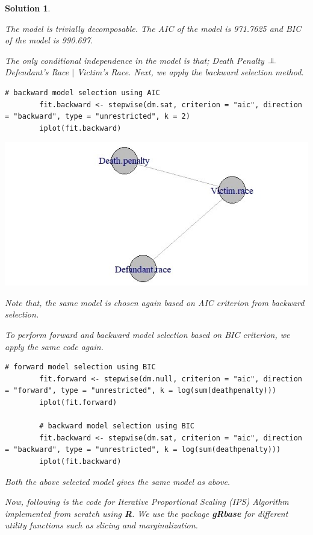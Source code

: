 \documentclass[12pt]{article}
\theoremstyle{problemstyle}
\newtheorem*{solution*}{Solution}
\newcommand{\indep}{\mathrel{\text{\scalebox{1.07}{$\perp\mkern-10mu\perp$}}}}
\begin{document}
\begin{solution*}
\begin{enumerate}
	 The model is trivially decomposable. The AIC of the model is 971.7625 and BIC of the model is 990.697.
	 
	 The only conditional independence in the model is that; Death Penalty $\indep$ Defendant's Race $\mid$ Victim's Race. Next, we apply the backward selection method. 
	 
	 
	 \begin{lstlisting}[style = R-code]
	 	# backward model selection using AIC
	 	fit.backward <- stepwise(dm.sat, criterion = "aic", direction = "backward", type = "unrestricted", k = 2)
	 	iplot(fit.backward)
	 \end{lstlisting}
	
	\includegraphics[width=\linewidth]{dp-aic-backward.jpeg}
	
	Note that, the same model is chosen again based on AIC criterion from backward selection.
	
	
	To perform forward and backward model selection based on BIC criterion, we apply the same code again.
	
	\begin{lstlisting}[style = R-code]
		# forward model selection using BIC
		fit.forward <- stepwise(dm.null, criterion = "aic", direction = "forward", type = "unrestricted", k = log(sum(deathpenalty)))
		iplot(fit.forward)
		
		# backward model selection using BIC
		fit.backward <- stepwise(dm.sat, criterion = "aic", direction = "backward", type = "unrestricted", k = log(sum(deathpenalty)))
		iplot(fit.backward)
	\end{lstlisting}
	
	Both the above selected model gives the same model as above.
	
	
	Now, following is the code for Iterative Proportional Scaling (IPS) Algorithm implemented from scratch using \textbf{R}. We use the package \textbf{gRbase} for different utility functions such as slicing and marginalization.
	

\end{enumerate}
\end{solution*}
\end{document}
